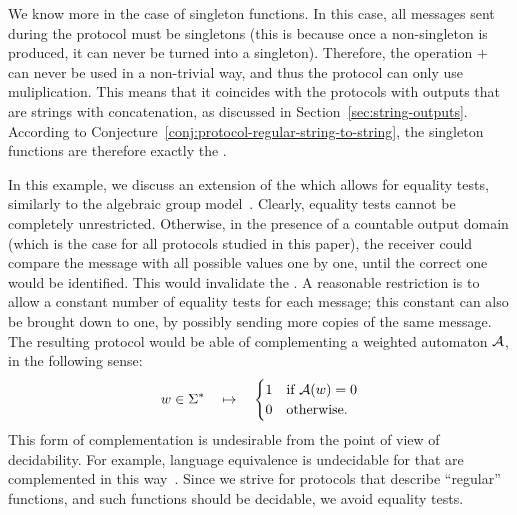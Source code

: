 \begin{myexample}
    We know more in the case of singleton functions. In this case, all messages sent during the protocol must be singletons (this is because once a non-singleton is produced, it can never be turned into a singleton). Therefore, the operation $+$ can never be used in a non-trivial way, and thus the protocol can only use muliplication. This means that it coincides with the protocols with outputs that are strings with concatenation, as discussed in Section~\ref{sec:string-outputs}. According to Conjecture~\ref{conj:protocol-regular-string-to-string}, the singleton functions are therefore exactly the .
\end{myexample}

\begin{myexample}
\label{ex:equality-tests}
In this example, we discuss an extension of the  which allows for
equality tests, similarly to the algebraic group
model~\cite{fuchsbauer2018algebraic}. Clearly, equality tests cannot be
completely unrestricted. Otherwise, in the presence of a countable output
domain (which is the case for all protocols studied in this paper), the
receiver could compare the message with all possible values one by one, until
the correct one would be identified. This would  invalidate the . A reasonable restriction is to allow a constant number of equality
tests for each message; this constant can also be brought down to one, by
possibly sending more copies of the same message. The resulting protocol would
be able of complementing a weighted automaton ${\mathcal A}$, in the following sense:
\begin{align*}
w \in \Sigma^* 
\quad \mapsto \quad 
\begin{cases}
    1 & \text{if ${\mathcal A}(w) =0$}\\
    0 & \text{otherwise}.
\end{cases}
\end{align*}
This form of complementation is undesirable from the point of view of decidability. For example, language equivalence is undecidable for  that are complemented in this way~\cite[Theorem 4.9]{bojanczyk_automata_2025}. 
Since we strive for protocols that describe ``regular'' functions, and such functions should be decidable, we avoid equality tests.
\end{myexample}

